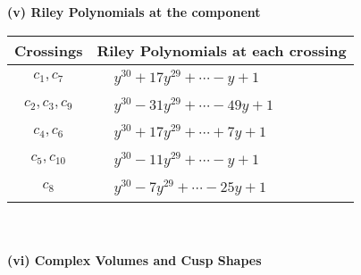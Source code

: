 \documentclass[1p]{elsarticle_modified}
\theoremstyle{definition}
\begin{document}
\newpage\renewcommand{\arraystretch}{1}
\flushleft \textbf{(v) Riley Polynomials at the component}\newline \\
\begin{tabular}{m{50pt}|m{274pt}}
Crossings & \hspace{64pt}Riley Polynomials at each crossing \\
\hline $$\begin{aligned}c_{1},c_{7}\end{aligned}$$&$\begin{aligned}
&y^{30}+17 y^{29}+\cdots- y+1
\end{aligned}$\\
\hline $$\begin{aligned}c_{2},c_{3},c_{9}\end{aligned}$$&$\begin{aligned}
&y^{30}-31 y^{29}+\cdots-49 y+1
\end{aligned}$\\
\hline $$\begin{aligned}c_{4},c_{6}\end{aligned}$$&$\begin{aligned}
&y^{30}+17 y^{29}+\cdots+7 y+1
\end{aligned}$\\
\hline $$\begin{aligned}c_{5},c_{10}\end{aligned}$$&$\begin{aligned}
&y^{30}-11 y^{29}+\cdots- y+1
\end{aligned}$\\
\hline $$\begin{aligned}c_{8}\end{aligned}$$&$\begin{aligned}
&y^{30}-7 y^{29}+\cdots-25 y+1
\end{aligned}$\\
\hline
\end{tabular}\\~\\
\newpage\flushleft \textbf{(vi) Complex Volumes and Cusp Shapes}
\end{document}
